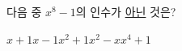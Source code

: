 다음 중 $x^8-1$의 인수가 \underline{아닌} 것은?
\begin{choices32}{$x+1$}{$x-1$}{$x^2+1$}{$x^2-x$}{$x^4+1$}\end{choices32}
